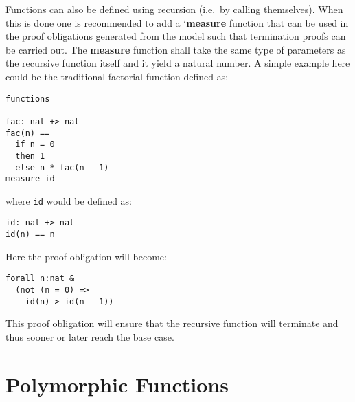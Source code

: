 \documentclass{overturerepchap}
\newcommand{\Lop}[1]{`{\bf\ttfamily #1}\Quote}
\begin{document}
Functions can also be defined using recursion (i.e.\ by calling
themselves). When this is done one is recommended to add
a \Lop{measure} function that can be used in the proof obligations
generated from the model such that termination proofs can be carried
out. The {\bf\ttfamily measure} function shall take the same type of
parameters as the recursive function itself and it yield a natural
number. A simple example here could be the traditional factorial function
defined as:
\begin{lstlisting}
functions

fac: nat +> nat
fac(n) ==
  if n = 0
  then 1
  else n * fac(n - 1)
measure id
\end{lstlisting}
where \texttt{id} would be defined as:
\begin{lstlisting}
id: nat +> nat
id(n) == n
\end{lstlisting}
Here the proof obligation will become:
\begin{lstlisting}
forall n:nat &
  (not (n = 0) =>
    id(n) > id(n - 1))
\end{lstlisting}
\noindent This proof obligation will ensure that the recursive
function will terminate and thus sooner or later reach the base case.

\section{Polymorphic Functions}
\end{document}
